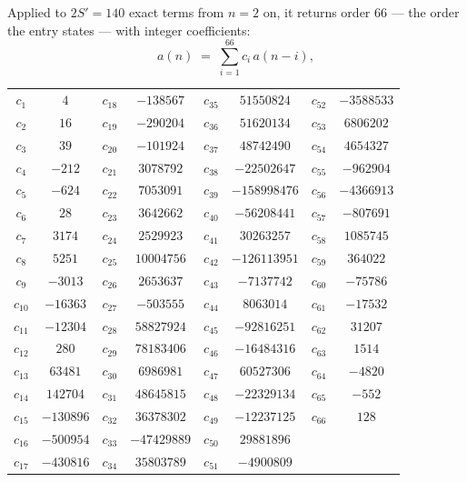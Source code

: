 \documentclass[11pt,a4paper]{article}
\theoremstyle{plain}
\theoremstyle{definition}
\begin{document}
Applied to $2S'=140$ exact terms from $n=2$ on, it returns order $66$ --- the
order the entry states --- with integer coefficients:
\[
a(n)\;=\;\sum_{i=1}^{66}c_i\,a(n-i),
\]
\begin{center}\small
\begin{tabular}{cccccccc}
$c_{1}$ & $4$ & $c_{18}$ & $-138567$ & $c_{35}$ & $51550824$ & $c_{52}$ & $-3588533$ \\
$c_{2}$ & $16$ & $c_{19}$ & $-290204$ & $c_{36}$ & $51620134$ & $c_{53}$ & $6806202$ \\
$c_{3}$ & $39$ & $c_{20}$ & $-101924$ & $c_{37}$ & $48742490$ & $c_{54}$ & $4654327$ \\
$c_{4}$ & $-212$ & $c_{21}$ & $3078792$ & $c_{38}$ & $-22502647$ & $c_{55}$ & $-962904$ \\
$c_{5}$ & $-624$ & $c_{22}$ & $7053091$ & $c_{39}$ & $-158998476$ & $c_{56}$ & $-4366913$ \\
$c_{6}$ & $28$ & $c_{23}$ & $3642662$ & $c_{40}$ & $-56208441$ & $c_{57}$ & $-807691$ \\
$c_{7}$ & $3174$ & $c_{24}$ & $2529923$ & $c_{41}$ & $30263257$ & $c_{58}$ & $1085745$ \\
$c_{8}$ & $5251$ & $c_{25}$ & $10004756$ & $c_{42}$ & $-126113951$ & $c_{59}$ & $364022$ \\
$c_{9}$ & $-3013$ & $c_{26}$ & $2653637$ & $c_{43}$ & $-7137742$ & $c_{60}$ & $-75786$ \\
$c_{10}$ & $-16363$ & $c_{27}$ & $-503555$ & $c_{44}$ & $8063014$ & $c_{61}$ & $-17532$ \\
$c_{11}$ & $-12304$ & $c_{28}$ & $58827924$ & $c_{45}$ & $-92816251$ & $c_{62}$ & $31207$ \\
$c_{12}$ & $280$ & $c_{29}$ & $78183406$ & $c_{46}$ & $-16484316$ & $c_{63}$ & $1514$ \\
$c_{13}$ & $63481$ & $c_{30}$ & $6986981$ & $c_{47}$ & $60527306$ & $c_{64}$ & $-4820$ \\
$c_{14}$ & $142704$ & $c_{31}$ & $48645815$ & $c_{48}$ & $-22329134$ & $c_{65}$ & $-552$ \\
$c_{15}$ & $-130896$ & $c_{32}$ & $36378302$ & $c_{49}$ & $-12237125$ & $c_{66}$ & $128$ \\
$c_{16}$ & $-500954$ & $c_{33}$ & $-47429889$ & $c_{50}$ & $29881896$ &  &  \\
$c_{17}$ & $-430816$ & $c_{34}$ & $35803789$ & $c_{51}$ & $-4900809$ &  &  \\
\end{tabular}
\end{center}
\end{document}
